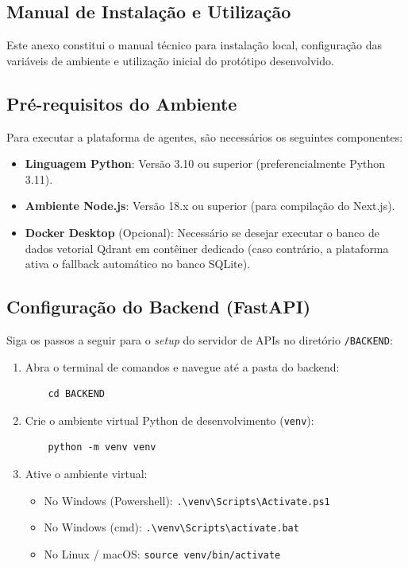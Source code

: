 \documentclass[12pt, openright, oneside, a4paper, brazil]{ads-unipac-abntex2}
\begin{document}
\begin{anexosenv}
\partanexos

\chapter{Manual de Instalação e Utilização}
Este anexo constitui o manual técnico para instalação local, configuração das variáveis de ambiente e utilização inicial do protótipo desenvolvido.

\section{Pré-requisitos do Ambiente}
Para executar a plataforma de agentes, são necessários os seguintes componentes:
\begin{itemize}
    \item \textbf{Linguagem Python}: Versão 3.10 ou superior (preferencialmente Python 3.11).
    \item \textbf{Ambiente Node.js}: Versão 18.x ou superior (para compilação do Next.js).
    \item \textbf{Docker Desktop} (Opcional): Necessário se desejar executar o banco de dados vetorial Qdrant em contêiner dedicado (caso contrário, a plataforma ativa o fallback automático no banco SQLite).
\end{itemize}

\section{Configuração do Backend (FastAPI)}
Siga os passos a seguir para o \textit{setup} do servidor de APIs no diretório \verb|/BACKEND|:

\begin{enumerate}
    \item Abra o terminal de comandos e navegue até a pasta do backend:
    \begin{verbatim}
    cd BACKEND
    \end{verbatim}
    
    \item Crie o ambiente virtual Python de desenvolvimento (\verb|venv|):
    \begin{verbatim}
    python -m venv venv
    \end{verbatim}
    
    \item Ative o ambiente virtual:
    \begin{itemize}
        \item No Windows (Powershell): \verb|.\venv\Scripts\Activate.ps1|
        \item No Windows (cmd): \verb|.\venv\Scripts\activate.bat|
        \item No Linux / macOS: \verb|source venv/bin/activate|
    \end{itemize}
    

\end{enumerate}
\end{anexosenv}
\end{document}
